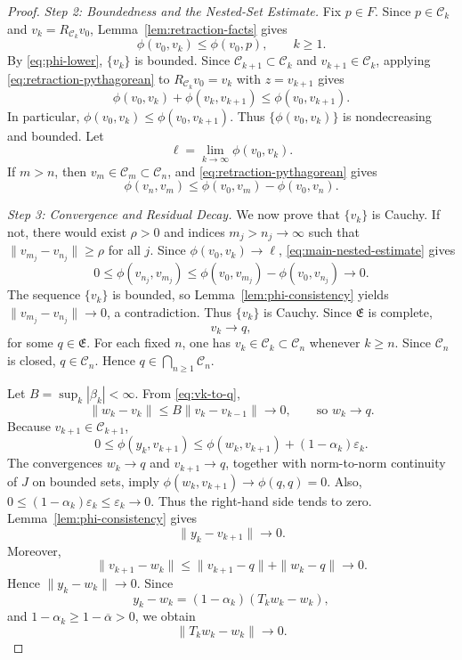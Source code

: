 \documentclass[leqno,12pt]{amsart}
\theoremstyle{definition}
\theoremstyle{remark}
\numberwithin{equation}{section}
\newcommand{\E}{\mathfrak{E}}
\newcommand{\C}{\mathscr{C}}
\begin{document}
\begin{proof}
\smallskip
\noindent\emph{Step 2: Boundedness and the Nested-Set Estimate.}
Fix $p\in F$. Since $p\in\C_k$ and $v_k=R_{\C_k}v_0$, Lemma~\ref{lem:retraction-facts} gives
\begin{equation}\label{eq:main-bounded}
 \phi(v_0,v_k)\leq\phi(v_0,p),
 \qquad k\geq1.
\end{equation}
By \eqref{eq:phi-lower}, $\{v_k\}$ is bounded. Since $\C_{k+1}\subset\C_k$ and $v_{k+1}\in\C_k$, applying \eqref{eq:retraction-pythagorean} to $R_{\C_k}v_0=v_k$ with $z=v_{k+1}$ gives
\[
 \phi(v_0,v_k)+\phi(v_k,v_{k+1})\leq\phi(v_0,v_{k+1}).
\]
In particular, $\phi(v_0,v_k)\leq\phi(v_0,v_{k+1})$.
Thus $\{\phi(v_0,v_k)\}$ is nondecreasing and bounded. Let
\[
 \ell=\lim_{k\to\infty}\phi(v_0,v_k).
\]
If $m>n$, then $v_m\in\C_m\subset\C_n$, and \eqref{eq:retraction-pythagorean} gives
\begin{equation}\label{eq:main-nested-estimate}
 \phi(v_n,v_m)
 \leq\phi(v_0,v_m)-\phi(v_0,v_n).
\end{equation}

\smallskip
\noindent\emph{Step 3: Convergence and Residual Decay.}
We now prove that $\{v_k\}$ is Cauchy. If not, there would exist $\rho>0$ and indices $m_j>n_j\to\infty$ such that $\|v_{m_j}-v_{n_j}\|\geq\rho$ for all $j$. Since $\phi(v_0,v_k)\to\ell$, \eqref{eq:main-nested-estimate} gives
\[
 0\leq\phi(v_{n_j},v_{m_j})
 \leq\phi(v_0,v_{m_j})-\phi(v_0,v_{n_j})\longrightarrow0.
\]
The sequence $\{v_k\}$ is bounded, so Lemma~\ref{lem:phi-consistency} yields $\|v_{m_j}-v_{n_j}\|\to0$, a contradiction. Thus $\{v_k\}$ is Cauchy. Since $\E$ is complete,
\begin{equation}\label{eq:vk-to-q}
 v_k\to q,
\end{equation}
for some $q\in\E$. For each fixed $n$, one has $v_k\in\C_k\subset\C_n$ whenever $k\geq n$. Since $\C_n$ is closed, $q\in\C_n$. Hence $q\in\bigcap_{n\geq1}\C_n$.

Let $B=\sup_k|\beta_k|<\infty$. From \eqref{eq:vk-to-q},
\[
 \|w_k-v_k\|\leq B\|v_k-v_{k-1}\|\to0,
 \qquad\text{so }w_k\to q.
\]
Because $v_{k+1}\in\C_{k+1}$,
\[
 0\leq\phi(y_k,v_{k+1})
 \leq\phi(w_k,v_{k+1})+(1-\alpha_k)\varepsilon_k.
\]
The convergences $w_k\to q$ and $v_{k+1}\to q$, together with norm-to-norm continuity of $J$ on bounded sets, imply $\phi(w_k,v_{k+1})\to\phi(q,q)=0$. Also, $0\leq(1-\alpha_k)\varepsilon_k\leq\varepsilon_k\to0$. Thus the right-hand side tends to zero. Lemma~\ref{lem:phi-consistency} gives
\[
 \|y_k-v_{k+1}\|\to0.
\]
Moreover,
\[
 \|v_{k+1}-w_k\|
 \leq \|v_{k+1}-q\|+\|w_k-q\|\to0.
\]
Hence $\|y_k-w_k\|\to0$. Since
\[
 y_k-w_k=(1-\alpha_k)(T_kw_k-w_k),
\]
and $1-\alpha_k\geq1-\overline\alpha>0$, we obtain
\begin{equation}\label{eq:main-residual}
 \|T_kw_k-w_k\|\to0.
\end{equation}


\end{proof}
\end{document}
